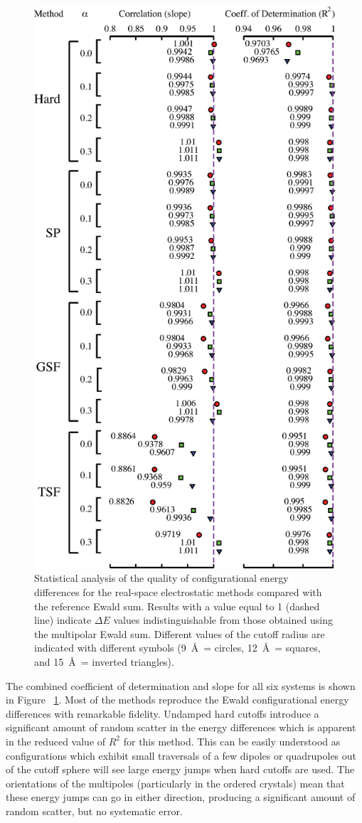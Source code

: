 \begin{figure}
  \centering
  \includegraphics[width=0.6\linewidth]{energyPlot_slopeCorrelation_combined.eps}
  \caption{Statistical analysis of the quality of configurational
    energy differences for the real-space electrostatic methods
    compared with the reference Ewald sum.  Results with a value equal
    to 1 (dashed line) indicate $\Delta E$ values indistinguishable
    from those obtained using the multipolar Ewald sum.  Different
    values of the cutoff radius are indicated with different symbols
    (9~\AA\ = circles, 12~\AA\ = squares, and 15~\AA\ = inverted
    triangles).\label{fig:slopeCorr_energy}}
\end{figure} 

The combined coefficient of determination and slope for all six
systems is shown in Figure ~\ref{fig:slopeCorr_energy}.  Most of the
methods reproduce the Ewald configurational energy differences with
remarkable fidelity.  Undamped hard cutoffs introduce a significant
amount of random scatter in the energy differences which is apparent
in the reduced value of $R^2$ for this method.  This can be easily
understood as configurations which exhibit small traversals of a few
dipoles or quadrupoles out of the cutoff sphere will see large energy
jumps when hard cutoffs are used.  The orientations of the multipoles
(particularly in the ordered crystals) mean that these energy jumps
can go in either direction, producing a significant amount of random
scatter, but no systematic error.


